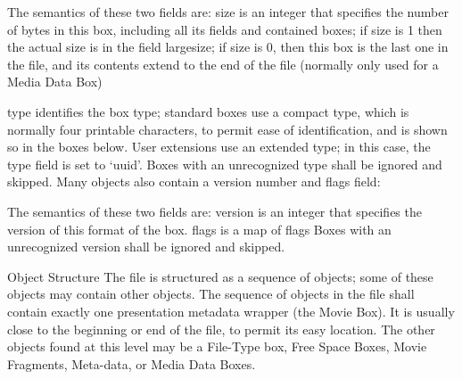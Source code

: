 The semantics of these two fields are:
size is an integer that specifies the number of bytes in this box, including all its fields and contained
boxes; if size is 1 then the actual size is in the field largesize; if size is 0, then this box is the last
one in the file, and its contents extend to the end of the file (normally only used for a Media Data Box)

type identifies the box type; standard boxes use a compact type, which is normally four printable
characters, to permit ease of identification, and is shown so in the boxes below. User extensions use
an extended type; in this case, the type field is set to ‘uuid’.
Boxes with an unrecognized type shall be ignored and skipped.
Many objects also contain a version number and flags field:

The semantics of these two fields are:
version is an integer that specifies the version of this format of the box.
flags is a map of flags
Boxes with an unrecognized version shall be ignored and skipped.

Object Structure
The file is structured as a sequence of objects; some of these objects may contain other objects. The
sequence of objects in the file shall contain exactly one presentation metadata wrapper (the Movie Box). It is
usually close to the beginning or end of the file, to permit its easy location. The other objects found at this level
may be a File-Type box, Free Space Boxes, Movie Fragments, Meta-data, or Media Data Boxes.

